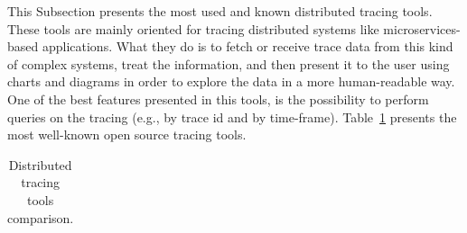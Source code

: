 This Subsection presents the most used and known distributed tracing tools. These tools are mainly oriented for tracing distributed systems like microservices-based applications. What they do is to fetch or receive trace data from this kind of complex systems, treat the information, and then present it to the user using charts and diagrams in order to explore the data in a more human-readable way. One of the best features presented in this tools, is the possibility to perform queries on the tracing (e.g., by trace id and by time-frame). Table~\ref{table:distributed_tracing_tools} presents the most well-known open source tracing tools.

\begin{table}[]
    \caption{Distributed tracing tools comparison.}
    \label{table:distributed_tracing_tools}
    \centering
    \begin{tabularx}{\linewidth} {
            >{\hsize=0.234\hsize}X|
            >{\hsize=0,383\hsize}X|
            >{\hsize=0,383\hsize}X|}
        \cline{2-3}


\end{tabularx}
\end{table}
